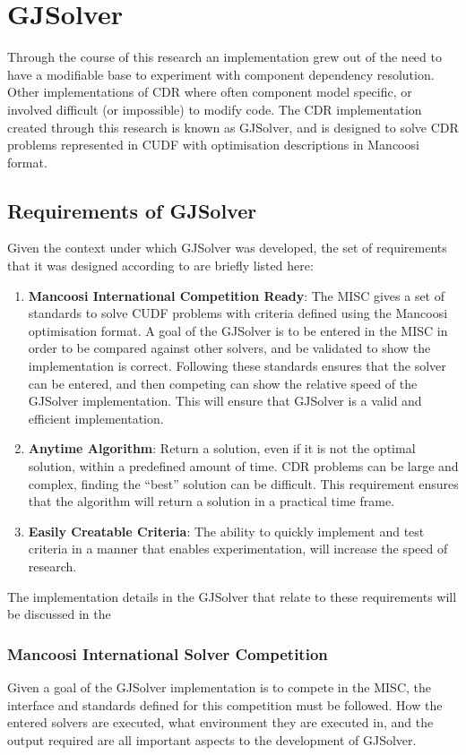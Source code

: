 \section{GJSolver}
Through the course of this research an implementation grew out of the need to have a modifiable base to experiment with component dependency resolution.
Other implementations of CDR where often component model specific, or involved difficult (or impossible) to modify code.
The CDR implementation created through this research is known as GJSolver, 
and is designed to solve CDR problems represented in CUDF with optimisation descriptions in Mancoosi format.

\subsection{Requirements of GJSolver}

Given the context under which GJSolver was developed, the set of requirements that it was designed according to are briefly listed here:
\begin{enumerate}
  \item \textbf{Mancoosi International Competition Ready}: The MISC gives a set of standards to solve CUDF problems with criteria defined using the Mancoosi optimisation format.
  A goal of the GJSolver is to be entered in the MISC in order to be compared against other solvers, and be validated to show the implementation is correct.
  Following these standards ensures that the solver can be entered, and then competing can show the relative speed of the GJSolver implementation.
  This will ensure that GJSolver is a valid and efficient implementation. 
  \item \textbf{Anytime Algorithm}: Return a solution, even if it is not the optimal solution, within a predefined amount of time. 
  CDR problems can be large and complex, finding the ``best'' solution can be difficult. 
  This requirement ensures that the algorithm will return a solution in a practical time frame.
  \item \textbf{Easily Creatable Criteria}: The ability to quickly implement and test criteria in a manner that enables experimentation, will increase the speed of research.
\end{enumerate}

The implementation details in the GJSolver that relate to these requirements will be discussed in the 

\subsubsection{Mancoosi International Solver Competition}
Given a goal of the GJSolver implementation is to compete in the MISC, the interface and standards defined for this competition must be followed.
How the entered solvers are executed, what environment they are executed in, and the output required are all important aspects to the development of GJSolver.


